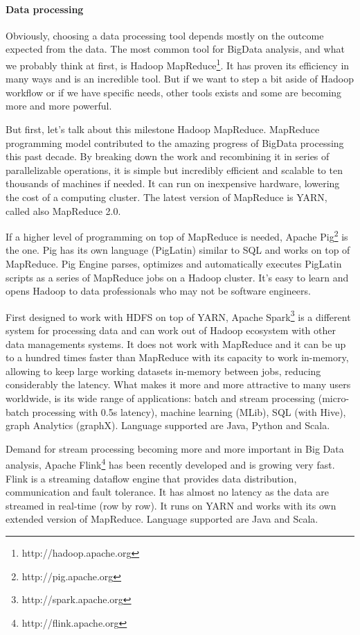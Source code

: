 \paragraph{Data processing}

Obviously, choosing a data processing tool depends mostly on the outcome expected from the data.
The most common tool for BigData analysis, and what we probably think at first, is Hadoop MapReduce\footnote{http://hadoop.apache.org}.
It has proven its efficiency in many ways and is an incredible tool.
But if we want to step a bit aside of Hadoop workflow or if we have specific needs, other tools exists and some are becoming more and more powerful.

But first, let’s talk about this milestone Hadoop MapReduce.
MapReduce programming model contributed to the amazing progress of BigData processing this past decade.
By breaking down the work and recombining it in series of parallelizable operations, it is simple but incredibly efficient and scalable to ten thousands of machines if needed.
It can run on inexpensive hardware, lowering the cost of a computing cluster.
The latest version of MapReduce is YARN, called also MapReduce 2.0.

If a higher level of programming on top of MapReduce is needed, Apache Pig\footnote{http://pig.apache.org} is the one.
Pig has its own language (PigLatin) similar to SQL and works on top of MapReduce.
Pig Engine parses, optimizes and automatically executes PigLatin scripts as a series of MapReduce jobs on a Hadoop cluster.
It’s easy to learn and opens Hadoop to data professionals who may not be software engineers.

First designed to work with HDFS on top of YARN, Apache Spark\footnote{http://spark.apache.org} is a different system for processing data and can work out of Hadoop ecosystem with other data managements systems.
It does not work with MapReduce and it can be up to a hundred times faster than MapReduce with its capacity to work in-memory, allowing to keep large working datasets in-memory between jobs, reducing considerably the latency.
What makes it more and more attractive to many users worldwide, is its wide range of applications: batch and stream processing (micro-batch processing with 0.5s latency), machine learning (MLib), SQL (with Hive), graph Analytics (graphX).
Language supported are Java, Python and Scala.

Demand for stream processing becoming more and more important in Big Data analysis, Apache Flink\footnote{http://flink.apache.org} has been recently developed and is growing very fast.
Flink is a streaming dataflow engine that provides data distribution, communication and fault tolerance.
It has almost no latency as the data are streamed in real-time (row by row).
It runs on YARN and works with its own extended version of MapReduce. Language supported are Java and Scala.

